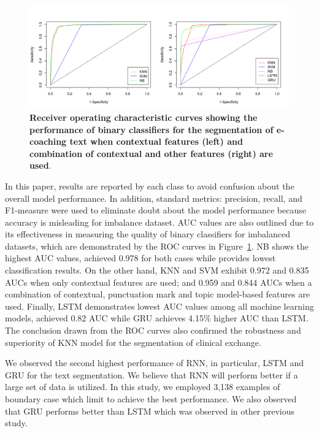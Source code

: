 \documentclass{amia}
\begin{document}
\begin{figure}[!htb]
    \centering
    \includegraphics[width=1.0\textwidth]{figures/roc-curves.png}
    \caption{\textbf{Receiver operating characteristic curves showing the performance of binary classifiers for the segmentation of e-coaching text when contextual features (left) and combination of contextual and other features (right) are used}.}
    \label{fig:roc-curves}
\end{figure}

In this paper, results are reported by each class to avoid confusion about the overall model performance. In addition, standard metrics: precision, recall, and F1-measure were used to eliminate doubt about the model performance because accuracy is misleading for imbalance dataset. AUC values are also outlined due to its effectiveness in measuring the quality of binary classifiers for imbalanced datasets\cite{hu2015kernelized}, which are demonstrated by the ROC curves in Figure~\ref{fig:roc-curves}. NB shows the highest AUC values, achieved 0.978 for both cases while provides lowest classification results. On the other hand, KNN and SVM exhibit 0.972 and 0.835 AUCs when only contextual features are used; and 0.959 and 0.844 AUCs when a combination of contextual, punctuation mark and topic model-based features are used. Finally, LSTM demonstrates lowest AUC values among all machine learning models, achieved 0.82 AUC while GRU achieves 4.15\% higher AUC than LSTM. The conclusion drawn from the ROC curves also confirmed the robustness and superiority of KNN model for the segmentation of clinical exchange.      

We observed the second highest performance of RNN, in particular, LSTM and GRU for the text segmentation. We believe that RNN will perform better if a large set of data is utilized. In this study, we employed 3,138 examples of boundary case which limit to achieve the best performance. We also observed that GRU performs better than LSTM which was observed in other previous study\cite{chung2014empirical}.
\end{document}
